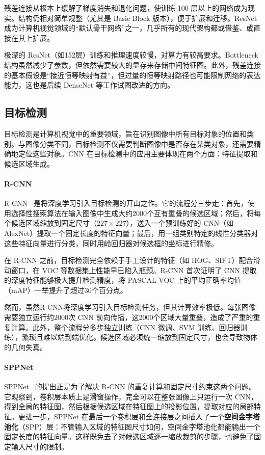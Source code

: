 残差连接从根本上缓解了梯度消失和退化问题，使训练 100 层以上的网络成为现实。结构仍相对简单规整（尤其是 Basic Block 版本），便于扩展和迁移。ResNet 成为计算机视觉领域的“默认骨干网络”之一，几乎所有的现代架构都或借鉴、或直接在其上扩展。

极深的 ResNet（如152层）训练和推理速度较慢，对算力有较高要求。Bottleneck 结构虽然减少了参数，但依然需要较大的显存来存储中间特征图。此外，残差连接的基本假设是“接近恒等映射有益”，但过量的恒等映射路径也可能限制网络的表达能力，这也是后续 DenseNet 等工作试图改进的方向。


\subsection{目标检测}

目标检测是计算机视觉中的重要领域，旨在识别图像中所有目标对象的位置和类别。与图像分类不同，目标检测不仅需要判断图像中是否存在某类对象，还需要精确地定位这些对象。CNN 在目标检测中的应用主要体现在两个方面：特征提取和候选区域生成。

\paragraph{R-CNN}

R-CNN~\cite{2014Rich} 是将深度学习引入目标检测的开山之作。它的流程分三步走：首先，使用选择性搜索算法在输入图像中生成大约2000个互有重叠的候选区域；然后，将每个候选区域缩放到固定尺寸（$227\times227$），送入一个预训练好的 CNN（如 AlexNet）提取一个固定长度的特征向量；最后，用一组类别特定的线性分类器对这些特征向量进行分类，同时用岭回归器对候选框的坐标进行精修。

在 R-CNN 之前，目标检测完全依赖于手工设计的特征（如 HOG、SIFT）配合滑动窗口，在 VOC 等数据集上性能早已陷入瓶颈。R-CNN 首次证明了 CNN 提取的深度特征能够极大提升检测精度，将 PASCAL VOC 上的平均正确率均值（mAP）一举提升了超过30个百分点。

然而，虽然R-CNN将深度学习引入目标检测任务，但其计算效率极低。每张图像需要独立运行约2000次 CNN 前向传播，这2000个区域大量重叠，造成了严重的重复计算。此外，整个流程分多步独立训练（CNN 微调、SVM 训练、回归器训练），繁琐且难以端到端优化。候选区域必须统一缩放到固定尺寸，也会导致物体的几何失真。

\paragraph{SPPNet}

SPPNet~\cite{He_2014} 的提出正是为了解决 R-CNN 的重复计算和固定尺寸约束这两个问题。它观察到，卷积层本质上是滑窗操作，完全可以在整张图像上只运行一次 CNN，得到全局的特征图，然后根据候选区域在特征图上的投影位置，提取对应的局部特征。更进一步，SPPNet 在最后一个卷积层和全连接层之间插入了一个\textbf{空间金字塔池化}（SPP）层：不管输入区域的特征图尺寸如何，空间金字塔池化都能输出一个固定长度的特征向量。这样既免去了对候选区域逐一缩放裁剪的步骤，也避免了固定输入尺寸的限制。

